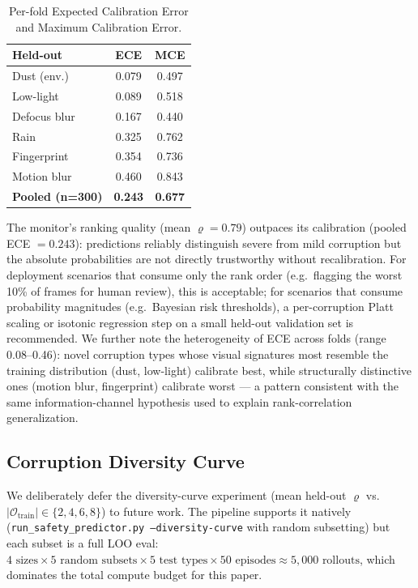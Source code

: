 \documentclass[letterpaper]{IEEEtran}
\renewcommand{\rho}{\varrho}
\begin{document}
\begin{table}[t]
\centering
\caption{Per-fold Expected Calibration Error and Maximum Calibration Error.}
\label{tab:ece}
\footnotesize
\setlength{\tabcolsep}{4pt}
\begin{tabular}{@{}lcc@{}}
\toprule
\textbf{Held-out} & \textbf{ECE} & \textbf{MCE} \\
\midrule
Dust (env.) & 0.079 & 0.497 \\
Low-light & 0.089 & 0.518 \\
Defocus blur & 0.167 & 0.440 \\
Rain & 0.325 & 0.762 \\
Fingerprint & 0.354 & 0.736 \\
Motion blur & 0.460 & 0.843 \\
\midrule
\textbf{Pooled (n=300)} & \textbf{0.243} & \textbf{0.677} \\
\bottomrule
\end{tabular}
\end{table}

The monitor's ranking quality (mean $\rho = 0.79$) outpaces its calibration (pooled ECE $= 0.243$): predictions reliably distinguish severe from mild corruption but the absolute probabilities are not directly trustworthy without recalibration.
For deployment scenarios that consume only the rank order (e.g.\ flagging the worst 10\% of frames for human review), this is acceptable; for scenarios that consume probability magnitudes (e.g.\ Bayesian risk thresholds), a per-corruption Platt scaling or isotonic regression step on a small held-out validation set is recommended.
We further note the heterogeneity of ECE across folds (range 0.08--0.46): novel corruption types whose visual signatures most resemble the training distribution (dust, low-light) calibrate best, while structurally distinctive ones (motion blur, fingerprint) calibrate worst --- a pattern consistent with the same information-channel hypothesis used to explain rank-correlation generalization.

\subsection{Corruption Diversity Curve}

We deliberately defer the diversity-curve experiment (mean held-out $\rho$ vs.\ $\lvert\mathcal{O}_{\text{train}}\rvert \in \{2, 4, 6, 8\}$) to future work.
The pipeline supports it natively (\texttt{run\_safety\_predictor.py --diversity-curve} with random subsetting) but each subset is a full LOO eval: $4 \text{ sizes} \times 5 \text{ random subsets} \times 5 \text{ test types} \times 50 \text{ episodes} \approx 5{,}000 \text{ rollouts}$, which dominates the total compute budget for this paper.
\end{document}
